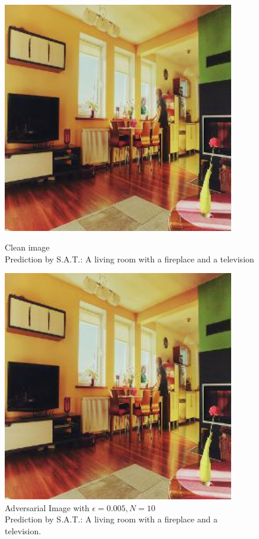 \begin{figure}[ht]
    \centering
    \begin{minipage}{0.45\textwidth}
        \centering
        \includegraphics[width=0.9\textwidth]{../code/ShowDistractAndDeceive/samples/0.000/img_0.jpg} %
        \caption*{Clean image\\Prediction by S.A.T.: A living room with a fireplace and a television}
    \end{minipage}\hfill
    \begin{minipage}{0.45\textwidth}
        \centering
        \includegraphics[width=0.9\textwidth]{../code/ShowDistractAndDeceive/samples/0.005/img_0.jpg} %
        \caption*{Adversarial Image with $\epsilon=0.005, N=10$\\Prediction by S.A.T.: A living room with a fireplace and a television.}
    \end{minipage}
\end{figure}

